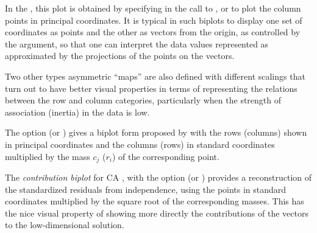 \documentclass[11pt]{book}
\begin{document}
In the , this plot is obtained by specifying  in the call to
, or  to plot the column points in principal coordinates.
It is typical in such biplots to display one set of coordinates as points
and the other as vectors from the origin, as controlled by the  argument,
so that one can interpret the data values represented as approximated by
the projections of the points on the vectors.

Two other types asymmetric ``maps'' are also defined with different scalings
that turn out to have better visual properties in terms of representing the relations
between the row and column categories, particularly when the strength of association
(inertia) in the data is low.
\begin{itemize*}
  \item The option  (or ) gives a biplot form proposed by
  \citet{GabrielOdoroff:1990} with the rows (columns) shown in principal coordinates and the
  columns (rows) in standard coordinates multiplied by the mass $c_j$ ($r_i$) of the corresponding
  point.
  \item The \emph{contribution biplot} for CA \citep{Greenacre:2013}, with the option
   (or ) provides a reconstruction of the standardized
  residuals from independence, using the points in standard coordinates multiplied by the square
  root of the corresponding masses.  This has the nice visual property of showing more directly
  the contributions of the vectors to the low-dimensional solution.
\end{itemize*}
\end{document}
